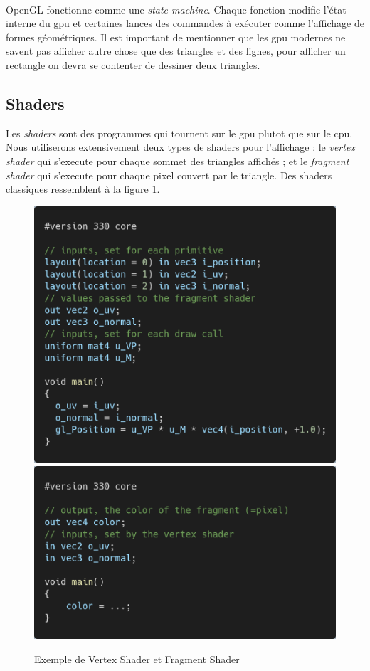 \documentclass[11pt]{article} %
\begin{document}
\paragraph{}
OpenGL fonctionne comme une \textit{state machine}. Chaque fonction modifie l'état interne du gpu et certaines lances des commandes à exécuter comme l'affichage de formes géométriques.
Il est important de mentionner que les gpu modernes ne savent pas afficher autre chose que des triangles et des lignes, pour afficher un rectangle on devra se contenter de dessiner deux triangles.

\subsection{Shaders}
\label{sec:shaders}

Les \textit{shaders} sont des programmes qui tournent sur le gpu plutot que sur le cpu. Nous utiliserons extensivement deux types de shaders pour l'affichage : le \textit{vertex shader} qui s'execute pour chaque sommet des triangles affichés ; et le \textit{fragment shader} qui s'execute pour chaque pixel couvert par le triangle. Des shaders classiques ressemblent à la figure \ref{fig:vs_fs_shaders}.

\begin{figure}[h]
	\centering
	\includegraphics[scale=.2]{vertex_sample}
	\includegraphics[scale=.2]{fragment_sample}
	\caption{Exemple de Vertex Shader et Fragment Shader}
	\label{fig:vs_fs_shaders}
\end{figure}
\end{document}
